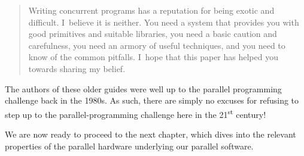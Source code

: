 \begin{quote}
	Writing concurrent programs has a reputation for being exotic
	and difficult. I~believe it is neither. You need a system
	that provides you with good primitives and suitable libraries,
	you need a basic caution and carefulness, you need an armory of
	useful techniques, and you need to know of the common pitfalls.
	I~hope that this paper has helped you towards sharing my belief.
\end{quote}

The authors of these older guides were well up to the parallel programming
challenge back in the 1980s.
As such, there are simply no excuses for refusing to step up to the
parallel-programming challenge here in the 21\textsuperscript{st} century!

We are now ready to proceed to the next chapter, which dives into the
relevant properties of the parallel hardware underlying our parallel
software.

